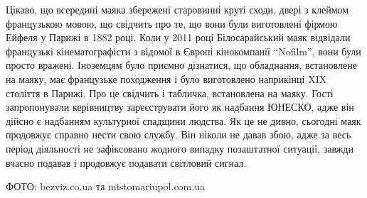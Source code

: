 Цікаво, що всередині маяка збережені старовинні круті сходи, двері з клеймом
французькою мовою, що свідчить про те, що вони були виготовлені фірмою Ейфеля у
Парижі в 1882 році. Коли у 2011 році Білосарайський маяк відвідали французькі
кінематографісти з відомої в Європі кінокомпанії \enquote{Nofilm}, вони були просто
вражені. Іноземцям було приємно дізнатися, що обладнання, встановлене на маяку,
має французьке походження і було виготовлено наприкінці XIX століття в Парижі.
Про це свідчить і табличка, встановлена на маяку. Гості запропонували
керівництву зареєструвати його як надбання ЮНЕСКО, адже він дійсно є надбанням
культурної спадщини людства. Як це не дивно, сьогодні маяк продовжує справно
нести свою службу. Він ніколи не давав збою, адже за весь період діяльності не
зафіксовано жодного випадку позаштатної ситуації, завжди вчасно подавав і
продовжує подавати світловий сигнал.

ФОТО: bezviz.co.ua та mistomariupol.com.ua



